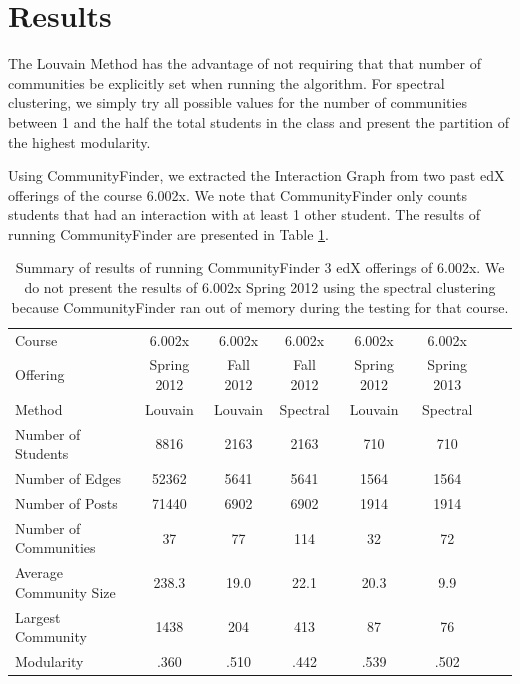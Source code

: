 \section{Results}
The Louvain Method has the advantage of not requiring that that number of communities be explicitly set when running the algorithm. For spectral clustering, we simply try all possible values for the number of communities between 1 and the half the total students in the class and present the partition of the highest modularity.

Using CommunityFinder, we extracted the Interaction Graph from two past edX offerings of the course 6.002x. We note that CommunityFinder only counts students that had an interaction with at least 1 other student. The results of running CommunityFinder are presented in Table \ref{results}.

\begin{table}[!htb]
\centering
    \begin{tabular}{l*{6}{c}r}
    Course & 6.002x &  6.002x & 6.002x & 6.002x & 6.002x\\
    Offering & Spring 2012 & Fall 2012 & Fall 2012 & Spring 2012 & Spring 2013 \\
    \hline
    Method & Louvain & Louvain & Spectral & Louvain & Spectral \\
    Number of Students & 8816 & 2163 & 2163  & 710 & 710 & \\
    Number of Edges & 52362 & 5641 & 5641 & 1564 & 1564 \\
    Number of Posts & 71440 & 6902 & 6902 & 1914 & 1914 \\
    Number of Communities & 37 & 77 & 114 & 32 & 72 \\
    Average Community Size & 238.3 & 19.0 & 22.1 & 20.3 & 9.9\\
    Largest Community & 1438 & 204 & 413 & 87 & 76 \\
    Modularity & .360 & .510 & .442 & .539 & .502 \\
    \end{tabular}
\caption{Summary of results of running CommunityFinder 3 edX offerings of 6.002x. We do not present the results of 6.002x Spring 2012 using the spectral clustering because CommunityFinder ran out of memory during the testing for that course.}
\label{results}
\end{table} 


